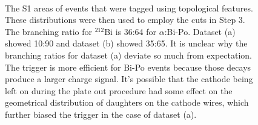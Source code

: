 \begin{figure}[hbtp]
\centering
{}\\
\caption[]{The S1 areas of events that were tagged using topological features. These distributions were then used to employ the cuts in Step 3. The branching ratio for $^{212}$Bi is 36:64 for $\alpha$:Bi-Po. Dataset (a) showed 10:90 and dataset (b) showed 35:65. It is unclear why the branching ratios for dataset (a) deviate so much from expectation. The trigger is more efficient for Bi-Po events because those decays produce a larger charge signal. It's possible that the cathode being left on during the plate out procedure had some effect on the geometrical distribution of daughters on the cathode wires, which further biased the trigger in the case of dataset (a).}
\label{fig:area_cut}
\end{figure}


